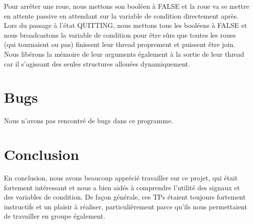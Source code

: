 \documentclass[a4paper]{article}
\begin{document}
Pour arrêter une roue, nous mettons son booléen à FALSE et la roue va se mettre en attente passive en attendant sur la variable de condition directement après. \\

Lors du passage à l'état QUITTING, nous mettons tous les booléens à FALSE et nous broadcastons la variable de condition pour être sûrs que toutes les roues (qui tournaient ou pas) finissent leur thread proprement et puissent être join. Nous libérons la mémoire de leur arguments également à la sortie de leur thread car il s'agissant des seules structures allouées dynamiquement.
\section{Bugs}
Nous n'avons pas rencontré de bugs dans ce programme.
\section{Conclusion}
En conclusion, nous avons beaucoup apprécié travailler sur ce projet, qui était fortement intéressant et nous a bien aidés à comprendre l'utilité des signaux et des variables de condition. De façon générale, ces TPs étaient toujours fortement instructifs et un plaisir à réaliser, particulièrement parce qu'ils nous permettaient de travailler en groupe également.
\end{document}
